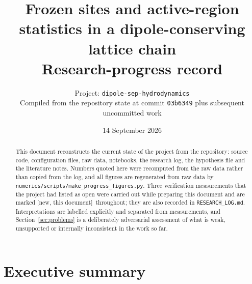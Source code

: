 \documentclass[11pt,a4paper]{article}
\title{\vspace{-1.2cm}\textbf{Frozen sites and active-region statistics in a
dipole-conserving lattice chain}\\[2mm]
\large Research-progress record}
\author{Project: \texttt{dipole-sep-hydrodynamics} \\
\small Compiled from the repository state at commit \texttt{03b6349} plus
subsequent uncommitted work}
\date{14 September 2026}
\newcommand{\NEW}{\textcolor{blue!55!black}{\textsf{\small[new, this document]}}}
\begin{document}
\maketitle
\thispagestyle{fancy}

\begin{abstract}
\noindent This document reconstructs the current state of the project from
the repository: source code, configuration files, raw data, notebooks, the
research log, the hypothesis file and the literature notes. Numbers quoted
here were recomputed from the raw data rather than copied from the log, and
all figures are regenerated from raw data by
\texttt{numerics/scripts/make\_progress\_figures.py}. Three verification
measurements that the project had listed as open were carried out while
preparing this document and are marked \NEW\ throughout; they are also
recorded in \texttt{RESEARCH\_LOG.md}. Interpretations are labelled
explicitly and separated from measurements, and Section~\ref{sec:problems}
is a deliberately adversarial assessment of what is weak, unsupported or
internally inconsistent in the work so far.
\end{abstract}

\section*{Executive summary}
\end{document}
